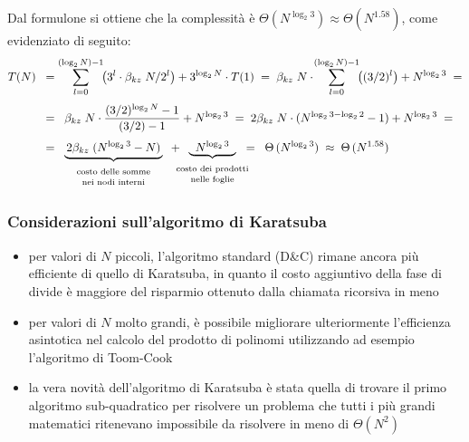 \noindent
Dal formulone si ottiene che la complessità è \(\Theta(N^{\log_2 3}) \approx \Theta(N^{1.58})\), come evidenziato di seguito:
\begin{align*}
	T(N) \;\; &= \sum_{l=0}^{(\log_2 N) - 1} \!\! \left( 3^l \cdot \beta_{kz} \; N / 2^l \right) + 3^{\log_2 N} \cdot T(1) \; = \; \beta_{kz} \; N \cdot \! \sum_{l=0}^{(\log_2 N) - 1} \!\! \left( (3/2)^l \right) + N^{\log_2 3} \; = \\[3pt]
	&= \;\; \beta_{kz} \; N \cdot \frac{(3/2)^{\log_2 N} - 1}{(3/2) - 1} + N^{\log_2 3} \; = \; 2 \beta_{kz} \; N \cdot (N^{\log_2 3 - \log_2 2} - 1) + N^{\log_2 3} \; = \\[3pt]
	&= \;\; \underbrace{\, 2 \beta_{kz} \; (N^{\log_2 3} - N) \,}_{\begin{array}{c} \text{\scriptsize costo delle somme} \\[-3pt] \text{\scriptsize nei nodi interni} \end{array}}
	\;\; + \!\!\!\!\!\! \underbrace{\;\;N^{\log_2 3}\;\;}_{\begin{array}{c} \text{\scriptsize costo dei prodotti} \\[-3pt] \text{\scriptsize nelle foglie} \end{array}} \!\!\!\!\!\! = \;\; \Theta \, (N^{\log_2 3}) \; \approx \; \Theta \, (N^{1.58})
\end{align*}

\subsubsection*{Considerazioni sull'algoritmo di Karatsuba}
\begin{itemize}
	\item per valori di \(N\) piccoli, l'algoritmo standard (D\&C) rimane ancora più efficiente di quello di Karatsuba,
	in quanto il costo aggiuntivo della fase di divide è maggiore del risparmio ottenuto dalla chiamata ricorsiva in meno
	\item per valori di \(N\) molto grandi, è possibile migliorare ulteriormente l'efficienza asintotica nel calcolo del
	prodotto di polinomi utilizzando ad esempio l'algoritmo di Toom-Cook
	\item la vera novità dell'algoritmo di Karatsuba è stata quella di trovare il primo algoritmo sub-quadratico per
	risolvere un problema che tutti i più grandi matematici ritenevano impossibile da risolvere in meno di \(\Theta(N^2)\)
\end{itemize}
